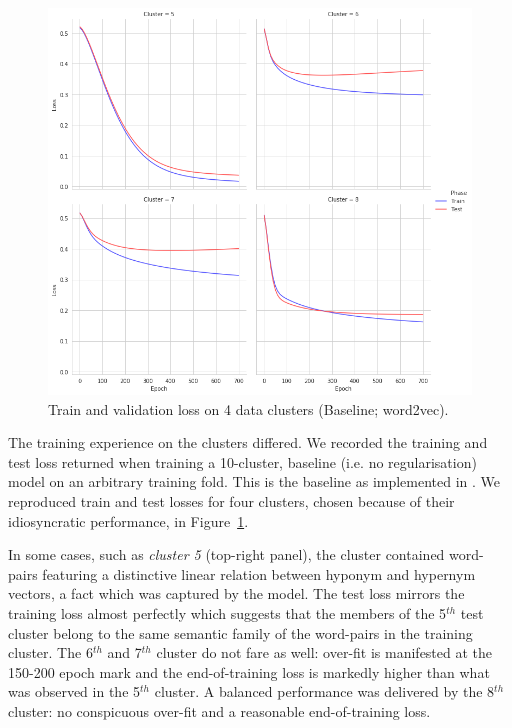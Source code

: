 \begin{figure}[ht!] 
  \centering
  \includegraphics[width=1.\linewidth]{images/Train_losses_4_clusters_baseline_w2v.png}
  \caption{Train and validation loss on 4 data clusters (Baseline; word2vec).}
  \label{fig:train_test_loss_w2v}
\end{figure}

The training experience on the clusters differed.  We recorded the training and test loss returned when training a 10-cluster, baseline (i.e. no regularisation) model on an arbitrary training fold. This is the \citep{Fu2014} baseline as implemented in \citep{ustalov2017negative}.  We reproduced train and test losses for four clusters, chosen because of their idiosyncratic performance, in Figure~\ref{fig:train_test_loss_w2v}.

In some cases, such as \textit{cluster 5} (top-right panel), the cluster contained word-pairs featuring a distinctive linear relation between hyponym and hypernym vectors, a fact which was captured by the model.  The test loss mirrors the training loss almost perfectly which suggests that the members of the 5$^{th}$ test cluster belong to the same semantic family of the word-pairs in the training cluster.  The 6$^{th}$ and 7$^{th}$ cluster do not fare as well: over-fit is manifested at the 150-200 epoch mark and the end-of-training loss is markedly higher than what was observed in the 5$^{th}$ cluster.  A balanced performance was delivered by the 8$^{th}$ cluster: no conspicuous over-fit and a reasonable end-of-training loss.

